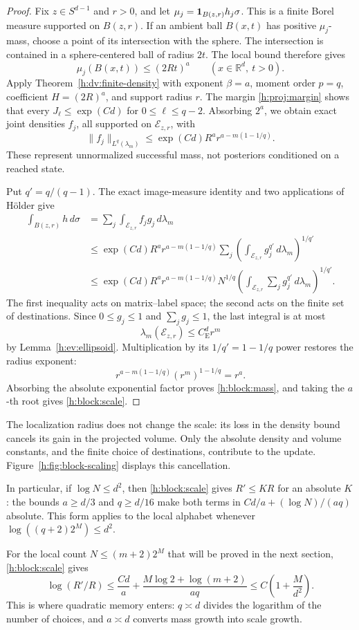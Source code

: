 \begin{proof}
Fix \(z\in S^{d-1}\) and \(r>0\), and let
\(\mu_j=\mathbf 1_{B(z,r)}h_j\sigma\). This is a finite Borel measure
supported on \(B(z,r)\). If an ambient ball \(B(x,t)\) has positive
\(\mu_j\)-mass, choose a point of its intersection with the sphere.
The intersection is contained in a sphere-centered ball of radius
\(2t\). The local bound therefore gives
\[
 \mu_j(B(x,t))\le(2Rt)^a
 \qquad(x\in\mathbb R^d,\ t>0).
\]
Apply Theorem~\ref{h:dv:finite-density} with exponent \(\beta=a\),
moment order \(p=q\), coefficient \(H=(2R)^a\), and support radius
\(r\). The margin \eqref{h:proj:margin} shows that every
\(J_\ell\le\exp(Cd)\) for \(0\le\ell\le q-2\).
Absorbing \(2^a\), we obtain exact joint
densities \(f_j\), all supported on \(\mathcal E_{z,r}\), with
\[
 \|f_j\|_{L^q(\lambda_m)}
 \le\exp(Cd)R^a r^{a-m(1-1/q)}.
\]
These represent unnormalized successful mass, not posteriors
conditioned on a reached state.

Put \(q'=q/(q-1)\). The exact image-measure identity and two
applications of H\"older give
\begin{align*}
 \int_{B(z,r)}h\,d\sigma
 &=\sum_j\int_{\mathcal E_{z,r}}f_jg_j\,d\lambda_m\\
 &\le\exp(Cd)R^a r^{a-m(1-1/q)}
   \sum_j\left(\int_{\mathcal E_{z,r}}g_j^{q'}\,d\lambda_m\right)^{1/q'}\\
 &\le\exp(Cd)R^a r^{a-m(1-1/q)}N^{1/q}
   \left(\int_{\mathcal E_{z,r}}\sum_jg_j^{q'}\,d\lambda_m\right)^{1/q'}.
\end{align*}
The first inequality acts on matrix--label space; the second acts
on the finite set of destinations. Since \(0\le g_j\le1\) and
\(\sum_jg_j\le1\), the last integral is at most
\[
 \lambda_m(\mathcal E_{z,r})\le C_{\mathrm E}^d r^m
\]
by Lemma~\ref{h:ev:ellipsoid}. Multiplication by its
\(1/q'=1-1/q\) power restores the radius exponent:
\[
 r^{a-m(1-1/q)}(r^m)^{1-1/q}=r^a.
\]
Absorbing the absolute exponential factor proves
\eqref{h:block:mass}, and taking the \(a\)-th root gives
\eqref{h:block:scale}.
\end{proof}

The localization radius does not change the scale: its loss in the
density bound cancels its gain in the projected volume. Only the
absolute density and volume constants, and the finite choice of
destinations, contribute to the update.
Figure~\ref{h:fig:block-scaling} displays this cancellation.


In particular, if \(\log N\le d^2\), then
\eqref{h:block:scale} gives \(R'\le KR\) for an absolute \(K\):
the bounds \(a\ge d/3\) and \(q\ge d/16\) make both terms in
\(Cd/a+(\log N)/(aq)\) absolute. This form applies to the local
alphabet whenever \(\log((q+2)2^M)\le d^2\).

For the local count \(N\le(m+2)2^M\) that will be proved in the next
section, \eqref{h:block:scale} gives
\[
 \log(R'/R)
 \le\frac{Cd}{a}+
 \frac{M\log2+\log(m+2)}{aq}
 \le C\left(1+\frac{M}{d^2}\right).
\]
This is where quadratic memory enters: \(q\asymp d\) divides the
logarithm of the number of choices, and \(a\asymp d\) converts mass
growth into scale growth.
